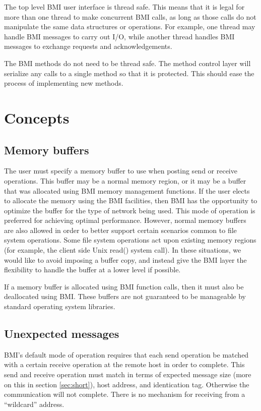 \documentclass[11pt]{article}
\begin{document}
The top level BMI user interface is thread safe.  This means that
it is legal for more than one thread to make concurrent BMI calls,
as long as those calls do not manipulate the same data structures
or operations.  For example, one thread may handle BMI messages to
carry out I/O, while another thread handles BMI messages to
exchange requests and acknowledgements.

The BMI methods do not need to be thread safe.  The method control
layer will serialize any calls to a single method so that it is
protected.  This should ease the process of implementing new
methods.

\section{Concepts}

\subsection{Memory buffers}

The user must specify a memory buffer to use when posting send or
receive operations.  This buffer may be a normal memory region, or it
may be a buffer that was allocated using BMI memory management functions.
If the user elects to allocate the memory using the BMI facilities, then
BMI has the opportunity to optimize the buffer for the type of network
being used.  This mode of operation is preferred for achieving optimal
performance.  However, normal memory buffers are also allowed in order
to better support certain scenarios common to file system operations.
Some file system operations act upon existing memory regions (for example,
the client side Unix read() system call).  In these situations, we would
like to avoid imposing a buffer copy, and instead give the BMI layer
the flexibility to handle the buffer at a lower level if possible.

If a memory buffer is allocated using BMI function calls, then it must
also be deallocated using BMI.  These buffers are not guaranteed to be
manageable by standard operating system libraries.

\subsection{Unexpected messages}
\label{sec:unexp}

BMI's default mode of operation requires that each send operation be
matched with a certain receive operation at the remote host in order to
complete.  This send and receive operation must match in terms of expected
message size (more on this in section \ref{sec:short}), host address,
and identication tag.  Otherwise the communication will not complete.
There is no mechanism for receiving from a ``wildcard'' address.
\end{document}
